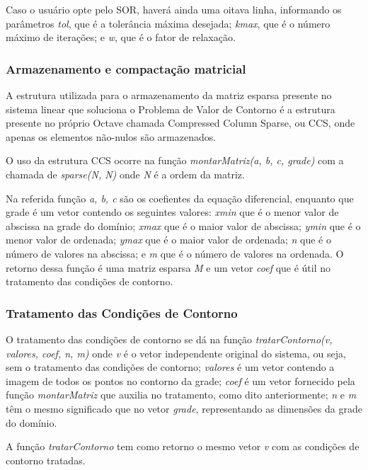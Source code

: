 \documentclass[
	article,			%
	11pt,				%
	oneside,			%
	a4paper,			%
	english,			%
	brazil,				%
	sumario=tradicional
	]{abntex2}
\begin{document}
Caso o usuário opte pelo SOR, haverá ainda uma oitava linha, informando os parâmetros \emph{tol}, que é a tolerância máxima
desejada; \emph{kmax}, que é o número máximo de iterações; e \emph{w}, que é o fator de relaxação.

\subsubsection{Armazenamento e compactação matricial}

A estrutura utilizada para o armazenamento da matriz esparsa presente no sistema linear que soluciona o Problema de Valor de Contorno
é a estrutura presente no próprio Octave chamada Compressed Column Sparse, ou CCS, onde apenas os elementos não-nulos são armazenados.

O uso da estrutura CCS ocorre na função \emph{montarMatriz(a, b, c, grade)} com a chamada de \emph{sparse(N, N)} onde \emph{N} é a ordem da matriz.

Na referida função \emph{a, b, c} são os coefientes da equação diferencial, enquanto que grade é um vetor contendo os seguintes valores:
\emph{xmin} que é o menor valor de abscissa na grade do domínio; \emph{xmax} que é o maior valor de abscissa; \emph{ymin} que é
o menor valor de ordenada; \emph{ymax} que é o maior valor de ordenada; \emph{n} que é o número de valores na abscissa; e \emph{m}
que é o número de valores na ordenada. O retorno dessa função é uma matriz esparsa \emph{M} e um vetor \emph{coef} que é útil
no tratamento das condições de contorno.

\subsubsection{Tratamento das Condições de Contorno}

O tratamento das condições de contorno se dá na função \emph{tratarContorno(v, valores, coef, n, m)} onde \emph{v} é o vetor independente
original do sistema, ou seja, sem o tratamento das condições de contorno; \emph{valores} é um vetor contendo a imagem de todos os pontos
no contorno da grade; \emph{coef} é um vetor fornecido pela função \emph{montarMatriz} que auxilia no tratamento, como dito anteriormente;
\emph{n} e \emph{m} têm o mesmo significado que no vetor \emph{grade}, representando as dimensões da grade do domínio.

A função \emph{tratarContorno} tem como retorno o mesmo vetor \emph{v} com as condições de contorno tratadas.
\end{document}
